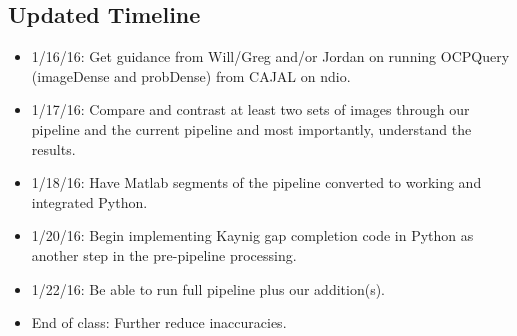 \documentclass[11pt]{article}
\begin{document}
\subsection{Updated Timeline}

\begin{itemize}
\item 1/16/16: Get guidance from Will/Greg and/or Jordan on running OCPQuery (imageDense and probDense) from CAJAL on ndio. \newline
\item 1/17/16: Compare and contrast at least two sets of images through our pipeline and the current pipeline and most importantly, understand the results. \newline
\item 1/18/16: Have Matlab segments of the pipeline converted to working and integrated Python. \newline
\item 1/20/16: Begin implementing Kaynig gap completion code in Python as another step in the pre-pipeline processing. \newline
\item 1/22/16: Be able to run full pipeline plus our addition(s). \newline
\item End of class: Further reduce inaccuracies. \newline
\end{itemize}
\end{document}
